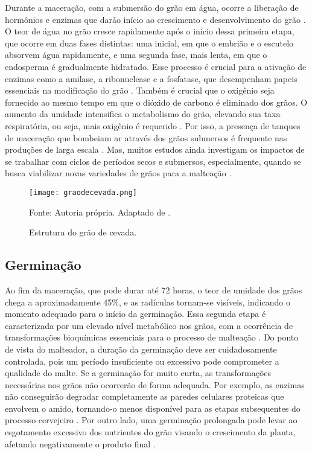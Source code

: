 Durante a maceração, com a submersão do grão em água, ocorre a liberação de hormônios e enzimas que darão início ao crescimento e desenvolvimento do grão \cite{LEWIS2012}. O teor de água no grão cresce rapidamente após o início dessa primeira etapa, que ocorre em duas fases distintas: uma inicial, em que o embrião e o escutelo absorvem água rapidamente, e uma segunda fase, mais lenta, em que o endosperma é gradualmente hidratado. Esse processo é crucial para a ativação de enzimas como a amilase, a ribonuclease e a fosfatase, que desempenham papeis essenciais na modificação do grão \cite{REYNOLDS1966}. Também é crucial que o oxigênio seja fornecido ao mesmo tempo em que o dióxido de carbono é eliminado dos grãos. O aumento da umidade intensifica o metabolismo do grão, elevando sua taxa respiratória, ou seja, mais oxigênio é requerido \cite{KUNZE1996}. Por isso, a presença de tanques de maceração que bombeiam ar através dos grãos submersos é frequente nas produções de larga escala \cite{CENCI2021}. Mas, muitos estudos ainda investigam os impactos de se trabalhar com ciclos de períodos secos e submersos, especialmente, quando se busca viabilizar novas variedades de grãos para a malteação \cite{MAYER2014,TURNER2019}.

\begin{figure}[ht]
    \centering
    \caption{Estrutura do grão de cevada.}
    \label{fig:graodecevada}
    \texttt{[image: graodecevada.png]}

    {\centering\footnotesize Fonte: Autoria própria. Adaptado de .\par}
\end{figure}



\subsection{Germinação}

Ao fim da maceração, que pode durar até 72 horas, o teor de umidade dos grãos chega a aproximadamente 45\%, e as radículas tornam-se visíveis, indicando o momento adequado para o início da germinação. Essa segunda etapa é caracterizada por um elevado nível metabólico nos grãos, com a ocorrência de transformações bioquímicas essenciais para o processo de malteação \cite{MALLETT2022}. Do ponto de vista do malteador, a duração da germinação deve ser cuidadosamente controlada, pois um período insuficiente ou excessivo pode comprometer a qualidade do malte. Se a germinação for muito curta, as transformações necessárias nos grãos não ocorrerão de forma adequada. Por exemplo, as enzimas não conseguirão degradar completamente as paredes celulares proteicas que envolvem o amido, tornando-o menos disponível para as etapas subsequentes do processo cervejeiro \cite{FOX2009}. Por outro lado, uma germinação prolongada pode levar ao esgotamento excessivo dos nutrientes do grão visando o crescimento da planta, afetando negativamente o produto final \cite{LEWIS2012}.

